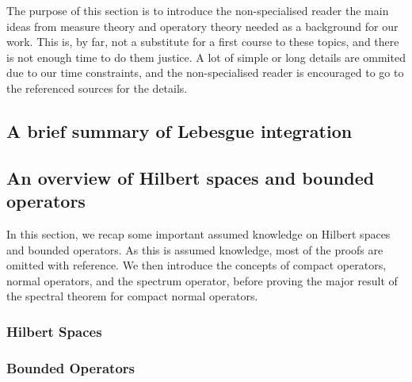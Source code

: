 The purpose of this section is to introduce the non-specialised reader the main ideas from measure theory and operatory theory needed as a background for our work. This is, by far, not a substitute for a first course to these topics, and there is not enough time to do them justice. A lot of simple or long details are ommited due to our time constraints, and the non-specialised reader is encouraged to go to the referenced sources for the details. 


\subsection{A brief summary of Lebesgue integration}


\subsection{An overview of Hilbert spaces and bounded operators}
In this section, we recap some important assumed knowledge on Hilbert spaces and bounded operators. As this is assumed knowledge, most of the proofs are omitted with reference. We then introduce the concepts of compact operators, normal operators, and the spectrum operator, before proving the major result of the spectral theorem for compact normal operators.
\subsubsection{Hilbert Spaces}\label{appendix_section_HS}


\subsubsection{Bounded Operators}

